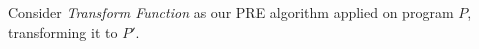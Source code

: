 \documentclass[notes, xcolor=dvipsnames]{beamer}
\begin{document}
    \begin{frame}
       
        Consider \emph{Transform Function} as our PRE algorithm applied on program $P$, transforming it to $P'$.
        \begin{figure}
        \end{figure}

        \begin{figure}
        \end{figure}

        \begin{figure}
        \end{figure}
        
    \end{frame}
\end{document}
